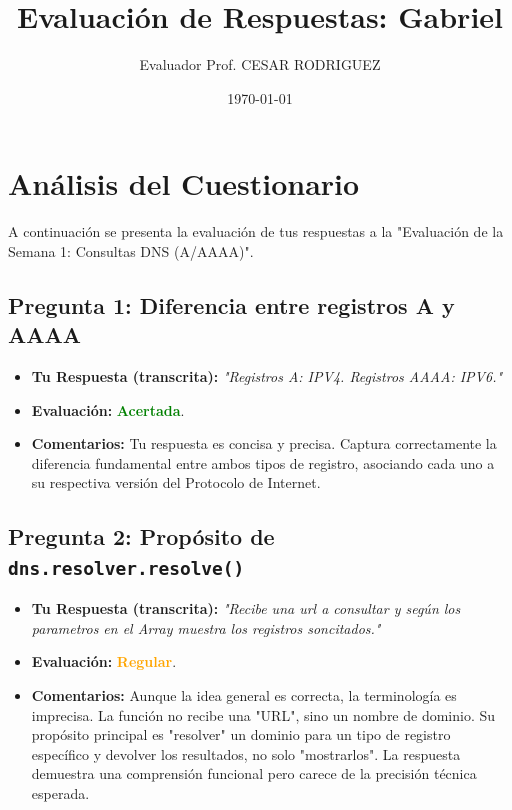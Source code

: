 \documentclass{article}
\title{Evaluación de Respuestas: Gabriel}
\author{Evaluador Prof. CESAR RODRIGUEZ}
\date{\today}
\begin{document}
\maketitle

\section*{Análisis del Cuestionario}

A continuación se presenta la evaluación de tus respuestas a la "Evaluación de la Semana 1: 
Consultas DNS (A/AAAA)".

\subsection*{Pregunta 1: Diferencia entre registros A y AAAA}
\begin{itemize}
    \item \textbf{Tu Respuesta (transcrita):} \textit{"Registros A: IPV4. Registros AAAA: IPV6."}
    \item \textbf{Evaluación:} \textbf{\textcolor{green}{Acertada}}.
    \item \textbf{Comentarios:} Tu respuesta es concisa y precisa. Captura correctamente la diferencia fundamental entre ambos tipos de registro, asociando cada uno a su respectiva versión del Protocolo de Internet.
\end{itemize}

\subsection*{Pregunta 2: Propósito de \texttt{dns.resolver.resolve()}}
\begin{itemize}
    \item \textbf{Tu Respuesta (transcrita):} \textit{"Recibe una url a consultar y según los parametros en el Array muestra los registros soncitados."}
    \item \textbf{Evaluación:} \textbf{\textcolor{orange}{Regular}}.
    \item \textbf{Comentarios:} Aunque la idea general es correcta, la terminología es imprecisa. La función no recibe una "URL", sino un nombre de dominio. Su propósito principal es "resolver" un dominio para un tipo de registro específico y devolver los resultados, no solo "mostrarlos". La respuesta demuestra una comprensión funcional pero carece de la precisión técnica esperada.
\end{itemize}
\end{document}

